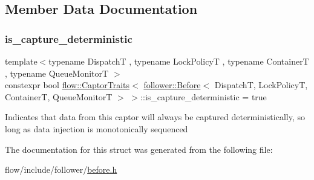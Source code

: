 \subsection{Member Data Documentation}
\mbox{\label{structflow_1_1_captor_traits_3_01follower_1_1_before_3_01_dispatch_t_00_01_lock_policy_t_00_01_c62c65191d3908e10afd70708af893571_a84e9d853507aea739c13eef4367500cc}} 
\subsubsection{\texorpdfstring{is\+\_\+capture\+\_\+deterministic}{is\_capture\_deterministic}}
{\footnotesize\ttfamily template$<$typename DispatchT , typename Lock\+PolicyT , typename ContainerT , typename Queue\+MonitorT $>$ \\
constexpr bool \hyperlink{structflow_1_1_captor_traits}{flow\+::\+Captor\+Traits}$<$ \hyperlink{classflow_1_1follower_1_1_before}{follower\+::\+Before}$<$ DispatchT, Lock\+PolicyT, ContainerT, Queue\+MonitorT $>$ $>$\+::is\+\_\+capture\+\_\+deterministic = true\hspace{0.3cm}{\ttfamily [static]}}

Indicates that data from this captor will always be captured deterministically, so long as data injection is monotonically sequenced 

The documentation for this struct was generated from the following file\+:\begin{DoxyCompactItemize}
\item 
flow/include/follower/\hyperlink{before_8h}{before.\+h}\end{DoxyCompactItemize}
